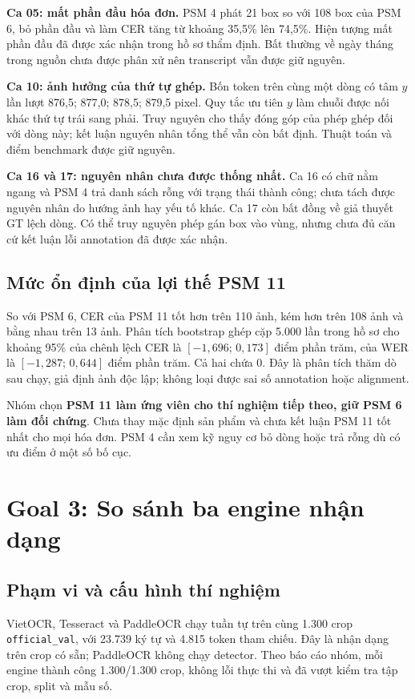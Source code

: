 \documentclass[11pt,a4paper]{article}
\begin{document}
\textbf{Ca 05: mất phần đầu hóa đơn.} PSM 4 phát 21 box so với 108 box của PSM 6, bỏ phần đầu và làm CER tăng từ khoảng 35,5\% lên 74,5\%. Hiện tượng mất phần đầu đã được xác nhận trong hồ sơ thẩm định. Bất thường về ngày tháng trong nguồn chưa được phân xử nên transcript vẫn được giữ nguyên.

\textbf{Ca 10: ảnh hưởng của thứ tự ghép.} Bốn token trên cùng một dòng có tâm $y$ lần lượt 876,5; 877,0; 878,5; 879,5 pixel. Quy tắc ưu tiên $y$ làm chuỗi được nối khác thứ tự trái sang phải. Truy nguyên cho thấy đóng góp của phép ghép đối với dòng này; kết luận nguyên nhân tổng thể vẫn còn bất định. Thuật toán và điểm benchmark được giữ nguyên.

\textbf{Ca 16 và 17: nguyên nhân chưa được thống nhất.} Ca 16 có chữ nằm ngang và PSM 4 trả danh sách rỗng với trạng thái thành công; chưa tách được nguyên nhân do hướng ảnh hay yếu tố khác. Ca 17 còn bất đồng về giả thuyết GT lệch dòng. Có thể truy nguyên phép gán box vào vùng, nhưng chưa đủ căn cứ kết luận lỗi annotation đã được xác nhận.

\subsection{Mức ổn định của lợi thế PSM 11}
So với PSM 6, CER của PSM 11 tốt hơn trên 110 ảnh, kém hơn trên 108 ảnh và bằng nhau trên 13 ảnh. Phân tích bootstrap ghép cặp 5.000 lần trong hồ sơ cho khoảng 95\% của chênh lệch CER là $[-1{,}696;\,0{,}173]$ điểm phần trăm, của WER là $[-1{,}287;\,0{,}644]$ điểm phần trăm. Cả hai chứa 0. Đây là phân tích thăm dò sau chạy, giả định ảnh độc lập; không loại được sai số annotation hoặc alignment.

Nhóm chọn \textbf{PSM 11 làm ứng viên cho thí nghiệm tiếp theo, giữ PSM 6 làm đối chứng}. Chưa thay mặc định sản phẩm và chưa kết luận PSM 11 tốt nhất cho mọi hóa đơn. PSM 4 cần xem kỹ nguy cơ bỏ dòng hoặc trả rỗng dù có ưu điểm ở một số bố cục.

\clearpage
\section{Goal 3: So sánh ba engine nhận dạng}
\subsection{Phạm vi và cấu hình thí nghiệm}
VietOCR, Tesseract và PaddleOCR chạy tuần tự trên cùng 1.300 crop \texttt{official\_val}, với 23.739 ký tự và 4.815 token tham chiếu. Đây là nhận dạng trên crop có sẵn; PaddleOCR không chạy detector. Theo báo cáo nhóm, mỗi engine thành công 1.300/1.300 crop, không lỗi thực thi và đã vượt kiểm tra tập crop, split và mẫu số.
\end{document}
